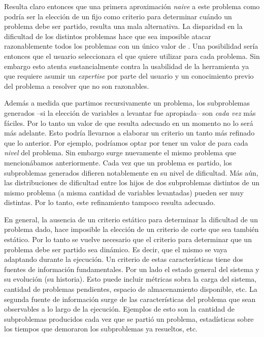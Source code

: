 Resulta claro entonces que una primera aproximación \emph{naive} a este
problema como podría ser la elección de un \tout fijo como criterio para
determinar cuándo un problema debe ser partido, resulta una mala alternativa.
La disparidad en la dificultad de los distintos problemas hace que sea
imposible atacar razonablemente todos los problemas con un único valor de \tout.
Una posibilidad sería entonces que el usuario seleccionara el \tout que quiere
utilizar para cada problema. Sin embargo esto atenta sustancialmente contra la
usabilidad de la herramienta ya que requiere asumir un \emph{expertise} por
parte del usuario y un conocimiento previo del problema a resolver que no son
razonables. 

Además a medida que partimos recursivamente un problema, los subproblemas
generados --si la elección de variables a levantar fue apropiada-- son
\emph{cada vez} más fáciles. Por lo tanto un valor de \tout que resulta
adecuado en un momento no lo será más adelante. Esto podría llevarnos a
elaborar un criterio un tanto más refinado que lo anterior. Por ejemplo,
podríamos optar por tener un valor de \tout para cada \emph{nivel} del
problema. Sin embargo surge nuevamente el mismo problema que mencionábamos
anteriormente. Cada vez que un problema es partido, los subproblemas generados
difieren notablemente en su nivel de dificultad. Más aún, las distribuciones
de dificultad entre los hijos de dos subproblemas distintos de un mismo
problema (a misma cantidad de variables levantadas) pueden ser muy distintas.
Por lo tanto, este refinamiento tampoco resulta adecuado.

En general, la ausencia de un criterio estático para determinar la dificultad
de un problema dado, hace imposible la elección de un criterio de corte que
sea también estático. Por lo tanto se vuelve necesario que el criterio para
determinar que un problema debe ser partido sea dinámico. Es decir, que el
mismo se vaya adaptando durante la ejecución. Un criterio de estas
características tiene dos fuentes de información fundamentales. Por un lado el
estado general del sistema y su evolución (su historia). Esto puede incluir
métricas sobra la carga del sistema, cantidad de problemas pendientes, espacio
de almacenamiento disponible, etc. La segunda fuente de información surge de
las características del problema que sean observables a lo largo de la
ejecución. Ejemplos de esto son la cantidad de subproblemas producidos cada
vez que se partió un problema, estadísticas sobre los tiempos que demoraron
los subproblemas ya resueltos, etc. 

